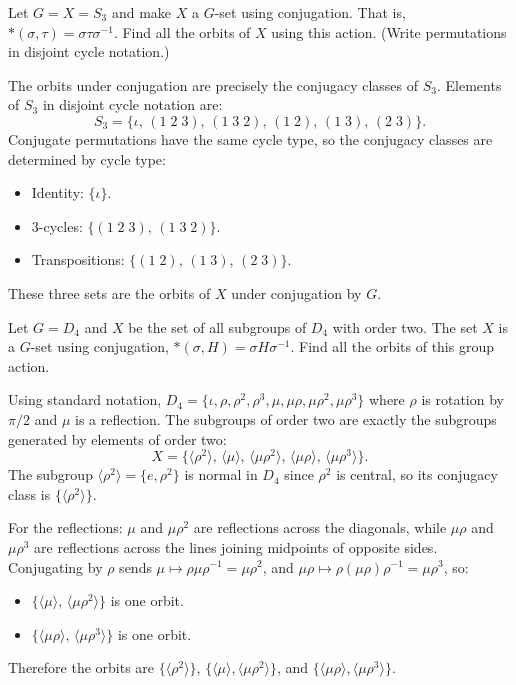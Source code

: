 \begin{problem}[14.6]
  Let $G = X = S_3$ and make $X$ a $G$-set using conjugation. That is, $*(\sigma, \tau) = \sigma\tau\sigma^{-1}$. Find all the orbits of $X$ using this action. (Write permutations in disjoint cycle notation.)
\end{problem}

\begin{solution}
  The orbits under conjugation are precisely the conjugacy classes of $S_3$. Elements of $S_3$ in disjoint cycle notation are:
  \[%
    S_3 = \{\iota,\, (1\;2\;3),\, (1\;3\;2),\, (1\;2),\, (1\;3),\, (2\;3)\}
  .\]%
  Conjugate permutations have the same cycle type, so the conjugacy classes are determined by cycle type:
  \begin{itemize}
    \item Identity: $\{\iota\}$.
    \item 3-cycles: $\{(1\;2\;3),\, (1\;3\;2)\}$.
    \item Transpositions: $\{(1\;2),\, (1\;3),\, (2\;3)\}$.
  \end{itemize}
  These three sets are the orbits of $X$ under conjugation by $G$.
\end{solution}

\begin{problem}[14.7]
  Let $G = D_4$ and $X$ be the set of all subgroups of $D_4$ with order two. The set $X$ is a $G$-set using conjugation, $*(\sigma, H) = \sigma H\sigma^{-1}$. Find all the orbits of this group action.
\end{problem}

\begin{solution}
  Using standard notation, $D_4 = \{\iota, \rho, \rho^2, \rho^3, \mu, \mu\rho, \mu\rho^2, \mu\rho^3\}$ where $\rho$ is rotation by $\pi/2$ and $\mu$ is a reflection. The subgroups of order two are exactly the subgroups generated by elements of order two:
  \[%
    X = \{\langle \rho^2 \rangle,\, \langle \mu \rangle,\, \langle \mu\rho^2 \rangle,\, \langle \mu\rho \rangle,\, \langle \mu\rho^3 \rangle\}
  .\]%
  The subgroup $\langle \rho^2 \rangle = \{e, \rho^2\}$ is normal in $D_4$ since $\rho^2$ is central, so its conjugacy class is $\{\langle \rho^2 \rangle\}$.

  For the reflections: $\mu$ and $\mu\rho^2$ are reflections across the diagonals, while $\mu\rho$ and $\mu\rho^3$ are reflections across the lines joining midpoints of opposite sides. Conjugating by $\rho$ sends $\mu \mapsto \rho\mu\rho^{-1} = \mu\rho^2$, and $\mu\rho \mapsto \rho(\mu\rho)\rho^{-1} = \mu\rho^3$, so:
  \begin{itemize}
    \item $\{\langle \mu \rangle,\, \langle \mu\rho^2 \rangle\}$ is one orbit.
    \item $\{\langle \mu\rho \rangle,\, \langle \mu\rho^3 \rangle\}$ is one orbit.
  \end{itemize}
  Therefore the orbits are $\{\langle \rho^2 \rangle\}$, $\{\langle \mu \rangle, \langle \mu\rho^2 \rangle\}$, and $\{\langle \mu\rho \rangle, \langle \mu\rho^3 \rangle\}$.
\end{solution}


